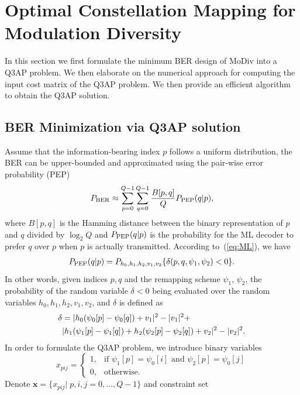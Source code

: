 \documentclass[journal,draftcls,onecolumn,12pt,twoside]{IEEEtran}
\newcommand{\PEP}{\rm{PEP}}
\newcommand{\BER}{\rm{BER}}
\begin{document}
\section{Optimal Constellation Mapping for Modulation Diversity}
\label{sec:core}
In this section we first formulate the minimum BER design of MoDiv into a Q3AP problem.
We then elaborate on the numerical approach for computing the input cost matrix of the Q3AP
problem. We then provide an efficient algorithm to obtain the Q3AP solution.

\subsection{BER Minimization via Q3AP solution}
Assume that the information-bearing index $p$ follows a uniform distribution,
the BER can be upper-bounded and approximated using the pair-wise error
probability (PEP)~\cite{harvind2005symbol}
\begin{align}
    P_{\BER} \approx \sum_{p=0}^{Q - 1}\sum_{q=0}^{Q - 1}\frac{B[p,
    q]}{Q}P_{\PEP}(q | p), \label{eq:P_BER}
\end{align}
where $B[p,q]$ is the Hamming distance between the binary representation of $p$
and $q$ divided by $\log_2Q$ and $P_{\PEP}(q | p)$ is the probability for the ML
decoder to prefer $q$ over $p$ when $p$ is actually transmitted. According to~(\ref{eq:ML}), we have
\begin{align}
    P_{\PEP}(q | p) = P_{h_0,h_1,h_2,v_1,v_2}\{\delta(p,q,\psi_1,\psi_2) < 0\}.
    \label{eq:P_PEP}
\end{align}
In other words, given indices $p, q$ and the remapping scheme $\psi_1$, $\psi_2$, the
probability of the random variable $\delta<0$ being evaluated over the random
variables $h_0,h_1,h_2,v_1,v_2$, and $\delta$ is defined as
\begin{align}
    \delta & = |h_0(\psi_0[p] - \psi_0[q]) + v_1|^2 - |v_1|^2 +\notag\\ 
    &
    |h_1(\psi_1[p] - \psi_1[q])+h_2(\psi_2[p] - \psi_2[q])+v_2|^2 -
    |v_2|^2.
    \label{eq:delta}
\end{align}
In order to formulate the Q3AP problem, we introduce binary variables
\[
x_{pij}= \left\{\begin{array}{ll}
1,& \mbox{if $\psi_1[p] = \psi_0[i]$ and $\psi_2[p] = \psi_0[j]$}\\
 0,& \mbox{otherwise.} \end{array} \right. \]
Denote $\mathbf{x} = \{x_{pij}|\;p,i,j=0,\ldots,Q-1\}$
and constraint set
\end{document}
